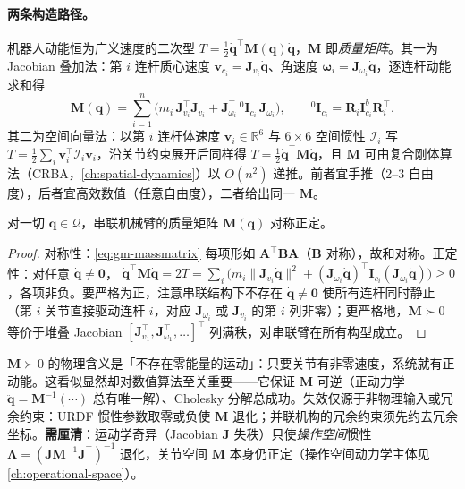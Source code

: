 \paragraph{两条构造路径。}
机器人动能恒为广义速度的二次型 $T=\tfrac12\dot{\mathbf q}^\top\mathbf M(\mathbf q)\dot{\mathbf q}$，$\mathbf M$ 即\emph{质量矩阵}。其一为 Jacobian 叠加法：第 $i$ 连杆质心速度 $\mathbf v_{c_i}=\mathbf J_{v_i}\dot{\mathbf q}$、角速度 $\boldsymbol\omega_i=\mathbf J_{\omega_i}\dot{\mathbf q}$，逐连杆动能求和得
\begin{equation}
  \mathbf M(\mathbf q)=\sum_{i=1}^n\Big(m_i\,\mathbf J_{v_i}^\top\mathbf J_{v_i}+\mathbf J_{\omega_i}^\top\,{}^0\mathbf I_{c_i}\,\mathbf J_{\omega_i}\Big),\qquad {}^0\mathbf I_{c_i}=\mathbf R_i\mathbf I_{c_i}^{b}\mathbf R_i^\top.
  \label{eq:gm-massmatrix}
\end{equation}
其二为空间向量法：以第 $i$ 连杆体速度 $\mathbf v_i\in\mathbb R^6$ 与 $6\times6$ 空间惯性 $\boldsymbol{\mathcal I}_i$ 写 $T=\tfrac12\sum_i\mathbf v_i^\top\boldsymbol{\mathcal I}_i\mathbf v_i$，沿关节约束展开后同样得 $T=\tfrac12\dot{\mathbf q}^\top\mathbf M\dot{\mathbf q}$，且 $\mathbf M$ 可由复合刚体算法（CRBA，\cref{ch:spatial-dynamics}）以 $O(n^2)$ 递推。前者宜手推（2--3 自由度），后者宜高效数值（任意自由度），二者给出同一 $\mathbf M$。

\begin{theorem}\label{thm:gm-spd}
对一切 $\mathbf q\in\mathcal Q$，串联机械臂的质量矩阵 $\mathbf M(\mathbf q)$ 对称正定。
\end{theorem}

\begin{proof}
对称性：\cref{eq:gm-massmatrix} 每项形如 $\mathbf A^\top\mathbf B\mathbf A$（$\mathbf B$ 对称），故和对称。正定性：对任意 $\dot{\mathbf q}\ne\mathbf0$，
$\dot{\mathbf q}^\top\mathbf M\dot{\mathbf q}=2T=\sum_i\big(m_i\|\mathbf J_{v_i}\dot{\mathbf q}\|^2+(\mathbf J_{\omega_i}\dot{\mathbf q})^\top\mathbf I_{c_i}(\mathbf J_{\omega_i}\dot{\mathbf q})\big)\ge0$，各项非负。要严格为正，注意串联结构下不存在 $\dot{\mathbf q}\ne\mathbf0$ 使所有连杆同时静止（第 $i$ 关节直接驱动连杆 $i$，对应 $\mathbf J_{\omega_i}$ 或 $\mathbf J_{v_i}$ 的第 $i$ 列非零）；更严格地，$\mathbf M\succ0$ 等价于堆叠 Jacobian $[\mathbf J_{v_1}^\top,\mathbf J_{\omega_1}^\top,\dots]^\top$ 列满秩，对串联臂在所有构型成立。
\end{proof}

\begin{insight}
$\mathbf M\succ0$ 的物理含义是「不存在零能量的运动」：只要关节有非零速度，系统就有正动能。这看似显然却对数值算法至关重要——它保证 $\mathbf M$ 可逆（正动力学 $\ddot{\mathbf q}=\mathbf M^{-1}(\cdots)$ 总有唯一解）、Cholesky 分解总成功。失效仅源于非物理输入或冗余约束：URDF 惯性参数取零或负使 $\mathbf M$ 退化；并联机构的冗余约束须先约去冗余坐标。\textbf{需厘清}：运动学奇异（Jacobian $\mathbf J$ 失秩）只使\emph{操作空间}惯性 $\boldsymbol\Lambda=(\mathbf J\mathbf M^{-1}\mathbf J^\top)^{-1}$ 退化，关节空间 $\mathbf M$ 本身仍正定（操作空间动力学主体见 \cref{ch:operational-space}\cite{khatib1987operational}）。
\end{insight}

